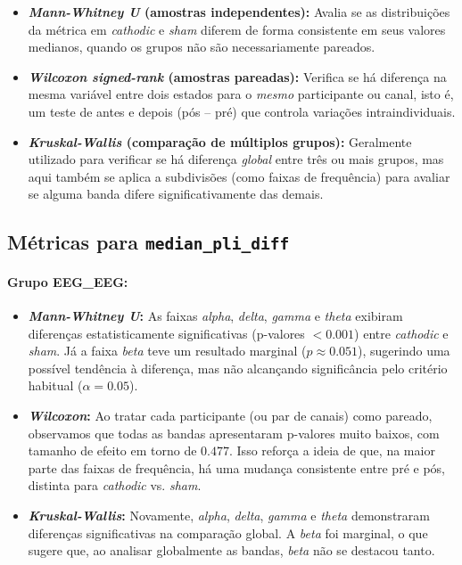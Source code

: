 \begin{itemize}
  \item \textbf{\textit{Mann-Whitney U} (amostras independentes):} Avalia se as distribuições da métrica em \textit{cathodic} e \textit{sham} diferem de forma consistente em seus valores medianos, quando os grupos não são necessariamente pareados.
  \item \textbf{\textit{Wilcoxon signed-rank} (amostras pareadas):} Verifica se há diferença na mesma variável entre dois estados para o \emph{mesmo} participante ou canal, isto é, um teste de antes e depois (pós -- pré) que controla variações intraindividuais.
  \item \textbf{\textit{Kruskal-Wallis} (comparação de múltiplos grupos):} Geralmente utilizado para verificar se há diferença \emph{global} entre três ou mais grupos, mas aqui também se aplica a subdivisões (como faixas de frequência) para avaliar se alguma banda difere significativamente das demais.
\end{itemize}

\subsection{Métricas para \texttt{median\_pli\_diff}}

\paragraph{Grupo EEG\_EEG:}
\begin{itemize}
    \item \textbf{\textit{Mann-Whitney U}:} As faixas \emph{alpha}, \emph{delta}, \emph{gamma} e \emph{theta} exibiram diferenças estatisticamente significativas (p-valores $< 0.001$) entre \emph{cathodic} e \textit{sham}. Já a faixa \emph{beta} teve um resultado marginal ($p \approx 0.051$), sugerindo uma possível tendência à diferença, mas não alcançando significância pelo critério habitual ($\alpha=0.05$).
    \item \textbf{\textit{Wilcoxon}:} Ao tratar cada participante (ou par de canais) como pareado, observamos que todas as bandas apresentaram p-valores muito baixos, com tamanho de efeito em torno de $0.477$. Isso reforça a ideia de que, na maior parte das faixas de frequência, há uma mudança consistente entre pré e pós, distinta para \textit{cathodic} vs. \textit{sham}.
    \item \textbf{\textit{Kruskal-Wallis}:} Novamente, \emph{alpha}, \emph{delta}, \emph{gamma} e \emph{theta} demonstraram diferenças significativas na comparação global. A \emph{beta} foi marginal, o que sugere que, ao analisar globalmente as bandas, \emph{beta} não se destacou tanto.
\end{itemize}

